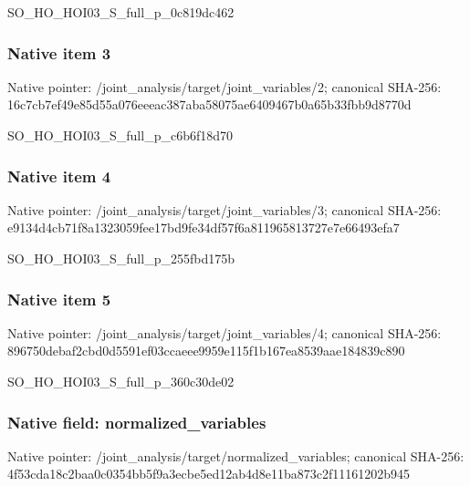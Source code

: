 \documentclass[10pt,a4paper]{article}
\begin{document}
\begingroup\raggedright\sloppy SO\_\allowbreak{}HO\_\allowbreak{}HOI03\_\allowbreak{}S\_\allowbreak{}full\_\allowbreak{}p\_\allowbreak{}0c819dc462\par\endgroup

\subsubsection{Native item 3}
Native pointer: /joint\_\allowbreak{}analysis/target/joint\_\allowbreak{}variables/2; canonical SHA-256: 16c7cb7ef49e85d55a076eeeac387aba58075ae6409467b0a65b33fbb9d8770d

\begingroup\raggedright\sloppy SO\_\allowbreak{}HO\_\allowbreak{}HOI03\_\allowbreak{}S\_\allowbreak{}full\_\allowbreak{}p\_\allowbreak{}c6b6f18d70\par\endgroup

\subsubsection{Native item 4}
Native pointer: /joint\_\allowbreak{}analysis/target/joint\_\allowbreak{}variables/3; canonical SHA-256: e9134d4cb71f8a1323059fee17bd9fe34df57f6a811965813727e7e66493efa7

\begingroup\raggedright\sloppy SO\_\allowbreak{}HO\_\allowbreak{}HOI03\_\allowbreak{}S\_\allowbreak{}full\_\allowbreak{}p\_\allowbreak{}255fbd175b\par\endgroup

\subsubsection{Native item 5}
Native pointer: /joint\_\allowbreak{}analysis/target/joint\_\allowbreak{}variables/4; canonical SHA-256: 896750debaf2cbd0d5591ef03ccaeee9959e115f1b167ea8539aae184839c890

\begingroup\raggedright\sloppy SO\_\allowbreak{}HO\_\allowbreak{}HOI03\_\allowbreak{}S\_\allowbreak{}full\_\allowbreak{}p\_\allowbreak{}360c30de02\par\endgroup

\subsubsection{Native field: normalized\_\allowbreak{}variables}
Native pointer: /joint\_\allowbreak{}analysis/target/normalized\_\allowbreak{}variables; canonical SHA-256: 4f53cda18c2baa0c0354bb5f9a3ecbe5ed12ab4d8e11ba873c2f11161202b945
\end{document}
